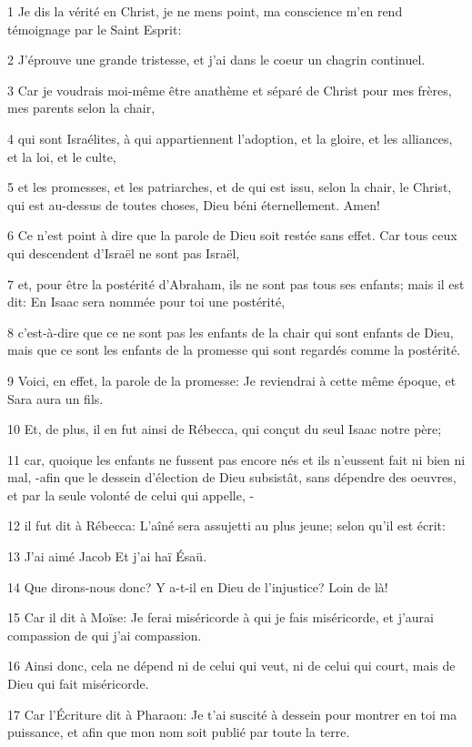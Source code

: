 \par 1 Je dis la vérité en Christ, je ne mens point, ma conscience m'en rend témoignage par le Saint Esprit:
\par 2 J'éprouve une grande tristesse, et j'ai dans le coeur un chagrin continuel.
\par 3 Car je voudrais moi-même être anathème et séparé de Christ pour mes frères, mes parents selon la chair,
\par 4 qui sont Israélites, à qui appartiennent l'adoption, et la gloire, et les alliances, et la loi, et le culte,
\par 5 et les promesses, et les patriarches, et de qui est issu, selon la chair, le Christ, qui est au-dessus de toutes choses, Dieu béni éternellement. Amen!
\par 6 Ce n'est point à dire que la parole de Dieu soit restée sans effet. Car tous ceux qui descendent d'Israël ne sont pas Israël,
\par 7 et, pour être la postérité d'Abraham, ils ne sont pas tous ses enfants; mais il est dit: En Isaac sera nommée pour toi une postérité,
\par 8 c'est-à-dire que ce ne sont pas les enfants de la chair qui sont enfants de Dieu, mais que ce sont les enfants de la promesse qui sont regardés comme la postérité.
\par 9 Voici, en effet, la parole de la promesse: Je reviendrai à cette même époque, et Sara aura un fils.
\par 10 Et, de plus, il en fut ainsi de Rébecca, qui conçut du seul Isaac notre père;
\par 11 car, quoique les enfants ne fussent pas encore nés et ils n'eussent fait ni bien ni mal, -afin que le dessein d'élection de Dieu subsistât, sans dépendre des oeuvres, et par la seule volonté de celui qui appelle, -
\par 12 il fut dit à Rébecca: L'aîné sera assujetti au plus jeune; selon qu'il est écrit:
\par 13 J'ai aimé Jacob Et j'ai haï Ésaü.
\par 14 Que dirons-nous donc? Y a-t-il en Dieu de l'injustice? Loin de là!
\par 15 Car il dit à Moïse: Je ferai miséricorde à qui je fais miséricorde, et j'aurai compassion de qui j'ai compassion.
\par 16 Ainsi donc, cela ne dépend ni de celui qui veut, ni de celui qui court, mais de Dieu qui fait miséricorde.
\par 17 Car l'Écriture dit à Pharaon: Je t'ai suscité à dessein pour montrer en toi ma puissance, et afin que mon nom soit publié par toute la terre.
